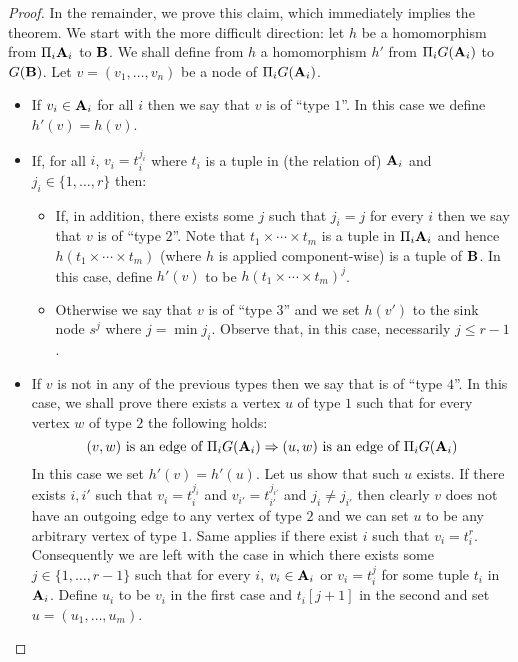 \documentclass{article}
\newcommand{\aest}{{\bf A}}
\newcommand{\best}{{\bf B}}
\begin{document}
\begin{proof}
In the remainder, we prove this claim,
which immediately implies the theorem. 
We start with the more difficult direction: let $h$ be a homomorphism from $\Pi_i \aest_i$ to $\best$.  We shall define from $h$ a homomorphism $h'$ from $\Pi_i G(\aest_i)$ to $G(\best)$. Let $v=(v_1,\dots,v_n)$ be a node of  $\Pi_i G(\aest_i)$. 



\begin{itemize}

\item If $v_i\in \aest_i$ for all $i$ then we say that $v$ is of ``type $1$''. In this case we define $h'(v)=h(v)$.

\item If, for all $i$, $v_i=t_i^{j_i}$ where $t_i$ is a tuple in (the relation of) $\aest_i$
and $j_i\in\{1,\dots,r\}$ then:

\begin{itemize}

\item If, in addition, there exists some $j$ such that $j_i=j$ for every $i$ then we say that $v$ is of ``type $2$''.  Note that $t_1\times\cdots\times t_m$ is a tuple in 
$\Pi_i \aest_i$ and hence $h(t_1\times\cdots\times t_m)$ (where $h$ is applied component-wise) is a tuple of $\best$. In this case, define $h'(v)$ to be $h(t_1\times\cdots\times t_m)^j$.

\item Otherwise we say that $v$ is of ``type $3$'' and we set $h(v')$
  to the sink node $s^j$ where $j=\min{j_i}$. Observe that, in this case, necessarily $j\leq r-1$.

\end{itemize}

\item If $v$ is not in any of the previous types then we say that is of ``type $4$''. In this case, we shall prove there exists a vertex $u$ of type $1$ such that for 
every vertex $w$ of type $2$ the following holds: 
$$(v,w) \text{ is an edge of } \Pi_i G(\aest_i) \Rightarrow (u,w) \text{ is an edge of } \Pi_i G(\aest_i)$$
In this case we set $h'(v)=h'(u)$.
Let us show that such $u$ exists. If there exists $i,i'$ such that $v_i=t_i^{j_i}$ and $v_{i'}=t_{i'}^{j_{i'}}$ and $j_i\neq j_{i'}$ then clearly $v$ does not have an outgoing edge to any vertex of type $2$ and we can set $u$ to be any arbitrary vertex of type $1$. Same applies if there exist $i$ such that $v_i=t_i^r$. Consequently we are left with the case in which there exists some $j\in\{1,\dots,r-1\}$ such that for every $i$, $v_i\in \aest_i$ or $v_i=t_i^{j}$ for some tuple $t_i$ in $\aest_i$. Define $u_i$ to be $v_i$ in the first case and $t_i[j+1]$ in the second and set $u=(u_1,\dots,u_m)$.


\end{itemize}
\end{proof}
\end{document}
